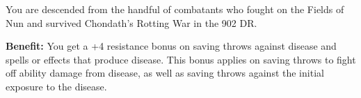 
You are descended from the handful of combatants who fought on the Fields of Nun and survived Chondath’s Rotting War in the 902 DR.

\textbf{Benefit:} You get a +4 resistance bonus on saving throws against disease and spells or effects that produce disease. This bonus applies on saving throws to fight off ability damage from disease, as well as saving throws against the initial exposure to the disease.